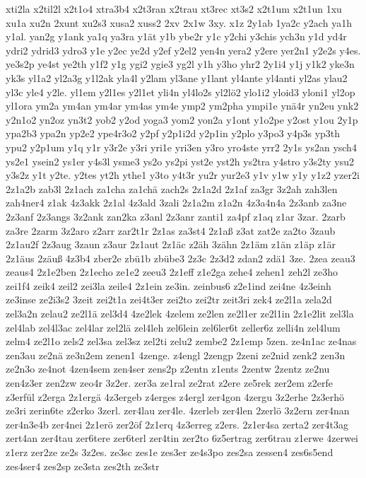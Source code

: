 {xti2la
x2til2l
x2t1o4
xtra3b4
x2t3ran
x2trau
xt3rec
xt3s2
x2t1um
x2t1un
1xu
xu1a
xu2n
2xunt
xu2s3
xusa2
xuss2
2xv
2x1w
3xy.
x1z
2y1ab
1ya2c
y2ach
ya1h
y1al.
yan2g
y1ank
ya1q
ya3ra
y1ät
y1b
ybe2r
y1c
y2chi
y3chis
ych3n
y1d
yd4r
ydri2
ydrid3
ydro3
y1e
y2ec
ye2d
y2ef
y2el2
yen4n
yera2
y2ere
yer2n1
y2e2s
y4es.
ye3s2p
ye4st
ye2th
y1f2
y1g
ygi2
ygie3
yg2l
y1h
y3ho
yhr2
2y1i4
y1j
y1k2
yke3n
yk3s
yl1a2
yl2a3g
y1l2ak
yla4l
y2lam
yl3ane
y1lant
yl4ante
yl4anti
yl2as
ylau2
yl3c
yle4
y2le.
yl1em
y2l1es
y2l1et
yli4n
yl4lo2s
yl2lö2
ylo1i2
yloid3
yloni1
yl2op
yl1ora
ym2a
ym4an
ym4ar
ym4as
ym4e
ymp2
ym2pha
ympi1e
ynä4r
yn2eu
ynk2
y2n1o2
yn2oz
yn3t2
yob2
y2od
yoga3
yom2
yon2a
y1ont
y1o2pe
y2ost
y1ou
2y1p
ypa2b3
ypa2n
yp2e2
ype4r3o2
y2pf
y2p1i2d
y2p1in
y2plo
y3po3
y4p3s
yp3th
ypu2
y2p1um
y1q
y1r
y3r2e
y3ri
yri1e
yri3en
y3ro
yro4ste
yrr2
2y1s
ys2an
ysch4
ys2e1
ysein2
ys1er
y4s3l
ysme3
ys2o
ys2pi
yst2e
yst2h
ys2tra
y4stro
y3s2ty
ysu2
y3s2z
y1t
y2te.
y2tes
yt2h
ythe1
y3to
y4t3r
yu2r
yur2e3
y1v
y1w
y1y
y1z2
yzer2i
2z1a2b
zab3l
2z1ach
za1cha
za1chä
zach2s
2z1a2d
2z1af
za3gr
3z2ah
zah3len
zah4ner4
z1ak
4z3akk
2z1al
4z3ald
3zali
2z1a2m
z1a2n
4z3a4n4a
2z3anb
za3ne
2z3anf
2z3angs
3z2ank
zan2ka
z3anl
2z3anr
zanti1
za4pf
z1aq
z1ar
3zar.
2zarb
za3re
2zarm
3z2aro
z2arr
zar2t1r
2z1as
za3st4
2z1aß
z3at
zat2e
za2to
3zaub
2z1au2f
2z3aug
3zaun
z3aur
2z1aut
2z1äc
z2äh
3zähn
2z1äm
z1än
z1äp
z1är
2z1äus
2zäuß
4z3b4
zber2e
zbü1b
zbübe3
2z3c
2z3d2
zdan2
zdä1
3ze.
2zea
zeau3
zeaus4
2z1e2ben
2z1echo
ze1e2
zeeu3
2z1eff
z1e2ga
zehe4
zehen1
zeh2l
ze3ho
zei1f4
zeik4
zeil2
zei3la
zeile4
2z1ein
ze3in.
zeinbus6
z2e1ind
zei4ne
4z3einh
ze3inse
ze2i3s2
3zeit
zei2t1a
zei4t3er
zei2to
zei2tr
zeit3ri
zek4
ze2l1a
zela2d
zel3a2n
zelau2
ze2l1ä
zel3d4
4ze2lek
4zelem
ze2len
ze2l1er
ze2l1in
2z1e2lit
zel3la
zel4lab
zel4l3ac
zel4lar
zel2lä
zel4leh
zel6lein
zel6ler6t
zeller6z
zelli4n
zel4lum
zelm4
ze2l1o
zels2
zel3sa
zel3sz
zel2ti
zelu2
zembe2
2z1emp
5zen.
ze4n1ac
ze4nas
zen3au
ze2nä
ze3n2em
zenen1
4zenge.
z4engl
2zengp
2zeni
ze2nid
zenk2
zen3n
ze2n3o
ze4not
4zen4sem
zen4ser
zens2p
z2entn
z1ents
2zentw
2zentz
ze2nu
zen4z3er
zen2zw
zeo4r
3z2er.
zer3a
ze1ral
ze2rat
z2ere
ze5rek
zer2em
z2erfe
z3erfül
z2erga
2z1ergä
4z3ergeb
z4erges
z4ergl
zer4gon
4zergu
3z2erhe
2z3erhö
ze3ri
zerin6te
z2erko
3zerl.
zer4lau
zer4le.
4zerleb
zer4len
2zerlö
3z2ern
zer4nan
zer4n3e4b
zer4nei
2z1erö
zer2öf
2z1erq
4z3erreg
z2ers.
2z1er4sa
zerta2
zer4t3ag
zert4an
zer4tau
zer6tere
zer6terl
zer4tin
zer2to
6z5ertrag
zer6trau
z1erwe
4zerwei
z1erz
zer2ze
ze2s
3z2es.
ze3sc
zes1e
zes3er
ze4s3po
zes2sa
zessen4
zes6s5end
zes4ser4
zes2sp
ze3sta
zes2th
ze3str
}
